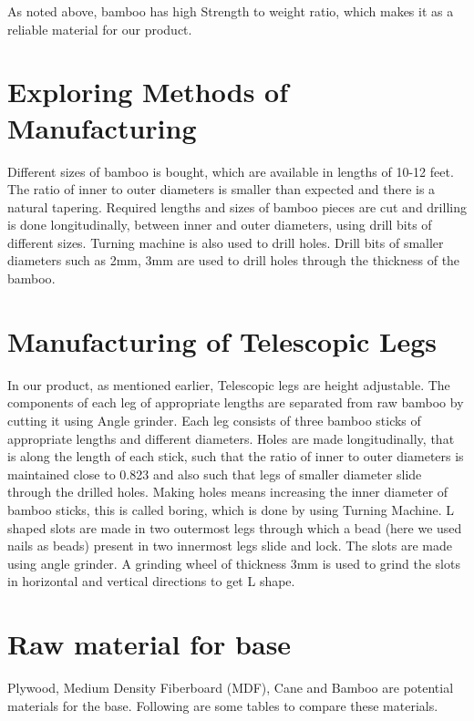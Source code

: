 As noted above, bamboo has high Strength to weight ratio, which makes it as a reliable material for our product. 

\section{Exploring Methods of Manufacturing}

Different sizes of bamboo is bought, which are available in lengths of 10-12 feet. The ratio of inner to outer diameters is smaller than expected and there is a natural tapering. Required lengths and sizes of bamboo pieces are cut  and drilling is done longitudinally, between inner and outer diameters, using drill bits of different sizes. Turning machine is also used to drill holes. Drill bits of smaller diameters such as 2mm, 3mm are used to drill holes through the thickness of the bamboo\cite{bamboo_flute}. 

\section{Manufacturing of Telescopic Legs}

In our product, as mentioned earlier, Telescopic legs are height adjustable. The components of each leg of appropriate lengths are separated from raw bamboo by cutting it using Angle grinder. Each leg consists of three bamboo sticks of appropriate lengths and different diameters. Holes are made longitudinally, that is along the length of each stick, such that the ratio of inner to outer diameters is maintained close to 0.823 and also such that legs of smaller diameter slide through the drilled holes. Making holes means increasing the inner diameter of bamboo sticks, this is called boring, which is done by using Turning Machine. L shaped slots are made in two outermost legs through which a bead (here we used nails as beads) present in two innermost legs slide and lock. The slots are made using angle grinder. A grinding wheel of thickness 3mm is used to grind the slots in horizontal and vertical directions to get L shape.

\section{Raw material for base}

Plywood, Medium Density Fiberboard (MDF), Cane and Bamboo are potential materials for the base. Following are some tables to compare these materials\cite{bamboo_mdf}.

